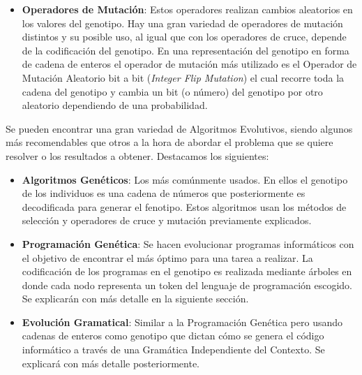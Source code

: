 \begin{itemize}
\item \textbf{Operadores de Mutación}: Estos operadores realizan cambios aleatorios en los valores del genotipo. Hay una gran variedad de operadores de mutación distintos y su posible uso, al igual que con los operadores de cruce, depende de la codificación del genotipo. En una representación del genotipo en forma de cadena de enteros el operador de mutación más utilizado es el Operador de Mutación Aleatorio bit a bit (\textit{Integer Flip Mutation}) el cual recorre toda la cadena del genotipo y cambia un bit (o número) del genotipo por otro aleatorio dependiendo de una probabilidad.
\end{itemize}

Se pueden encontrar una gran variedad de Algoritmos Evolutivos, siendo algunos más recomendables que otros a la hora de abordar el problema que se quiere resolver o los resultados a obtener. Destacamos los siguientes:
\begin{itemize}
\item \textbf{Algoritmos Genéticos}: Los más comúnmente usados. En ellos el genotipo de los individuos es una cadena de números que posteriormente es decodificada para generar el fenotipo\cite{cervigon09}. Estos algoritmos usan los métodos de selección y operadores de cruce y mutación previamente explicados. 

\item \textbf{Programación Genética}: Se hacen evolucionar programas informáticos con el objetivo de encontrar el más óptimo para una tarea a realizar. La codificación de los programas en el genotipo es realizada mediante árboles en donde cada nodo representa un token del lenguaje de programación escogido. Se explicarán con más detalle en la siguiente sección.

\item \textbf{Evolución Gramatical}: Similar a la Programación Genética pero usando cadenas de enteros como genotipo que dictan cómo se genera el código informático a través de una Gramática Independiente del Contexto. Se explicará con más detalle posteriormente.
\end{itemize}

